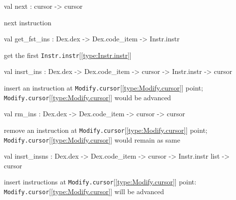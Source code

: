 \documentclass[11pt]{article}
\begin{document}
\label{val:Modify.next}\begin{ocamldoccode}
val next : cursor -> cursor
\end{ocamldoccode}
\begin{ocamldocdescription}
next instruction


\end{ocamldocdescription}




\label{val:Modify.get-underscorefst-underscoreins}\begin{ocamldoccode}
val get_fst_ins : Dex.dex -> Dex.code_item -> Instr.instr
\end{ocamldoccode}
\begin{ocamldocdescription}
get the first {\tt{Instr.instr}}[\ref{type:Instr.instr}]


\end{ocamldocdescription}




\label{val:Modify.insrt-underscoreins}\begin{ocamldoccode}
val insrt_ins : Dex.dex -> Dex.code_item -> cursor -> Instr.instr -> cursor
\end{ocamldoccode}
\begin{ocamldocdescription}
insert an instruction at {\tt{Modify.cursor}}[\ref{type:Modify.cursor}] point; {\tt{Modify.cursor}}[\ref{type:Modify.cursor}] would be advanced


\end{ocamldocdescription}




\label{val:Modify.rm-underscoreins}\begin{ocamldoccode}
val rm_ins : Dex.dex -> Dex.code_item -> cursor -> cursor
\end{ocamldoccode}
\begin{ocamldocdescription}
remove an instruction at {\tt{Modify.cursor}}[\ref{type:Modify.cursor}] point; {\tt{Modify.cursor}}[\ref{type:Modify.cursor}] would remain as same


\end{ocamldocdescription}




\label{val:Modify.insrt-underscoreinsns}\begin{ocamldoccode}
val insrt_insns :
  Dex.dex ->
  Dex.code_item -> cursor -> Instr.instr list -> cursor
\end{ocamldoccode}
\begin{ocamldocdescription}
insert instructions at {\tt{Modify.cursor}}[\ref{type:Modify.cursor}] point: {\tt{Modify.cursor}}[\ref{type:Modify.cursor}] will be advanced


\end{ocamldocdescription}
\end{document}
